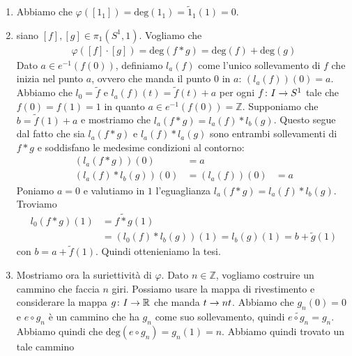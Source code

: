 \documentclass[a4paper]{article}
\begin{document}
\begin{snippetproof}{}
    \begin{enumerate}
        \item Abbiamo che \(\varphi([1_1]) = \text{deg}(1_1) = \tilde 1_1(1) = 0\).
        \item siano \([f], [g] \in \pi_1(S^1, 1)\). Vogliamo che
        \begin{align*}
            \varphi([f] \cdot [g]) = \text{deg}(f \ast g)
            = \text{deg}(f) + \text{deg}(g)
        \end{align*}
        Dato \(a \in e^{-1}(f(0))\), definiamo \(l_a(f)\) come l'unico
        sollevamento di \(f\) che inizia nel punto \(a\),
        ovvero che manda il punto \(0\) in \(a\): \((l_a(f))(0) = a\).
        Abbiamo che \(l_0 = \tilde f\)
        e \(l_a(f)(t) = \tilde f(t) + a\) per ogni \(f \colon I \to S^1\)
        tale che \(f(0) = f(1) = 1\) in quanto
        \(a \in e^{-1}(f(0)) = \mathbb{Z}\).
        Supponiamo che \(b = \tilde f(1) + a\)
        e mostriamo che \(l_a(f \ast g) = l_a(f) \ast l_b(g)\).
        Questo segue dal fatto che sia \(l_a(f \ast g)\) e \(l_a(f) \ast l_a(g)\)
        sono entrambi sollevamenti di \(f \ast g\) e soddisfano le medesime condizioni al contorno:
        \begin{align*}
            (l_a(f\ast g))(0) &= a \\
            (l_a(f) \ast l_b(g))(0) &= (l_a(f))(0) &= a
        \end{align*}
        Poniamo \(a=0\) e valutiamo in \(1\) l'eguaglianza \(l_a(f \ast g) = l_a(f) \ast l_b(g)\).
        Troviamo
        \begin{align*}
            l_0(f\ast g)(1) &= \tilde{f \ast g}(1) \\
            &=(l_0(f) \ast l_b(g))(1) = l_b(g)(1) = b + \tilde g(1)
        \end{align*}
        con \(b = a + \tilde f(1)\).
        Quindi ottenieniamo la tesi.
        \item Mostriamo ora la suriettività di \(\varphi\).
        Dato \(n \in \mathbb{Z}\), vogliamo costruire un cammino che faccia \(n\) giri.
        Possiamo usare la mappa di rivestimento e considerare la mappa \(g \colon I \to \mathbb{R}\)
        che manda \(t \to nt\).
        Abbiamo che \(g_n(0) = 0\)
        e \(e \circ g_n\) è un cammino che ha \(g_n\) come suo sollevamento, quindi
        \(\tilde{e\circ g_n} = g_n\).
        Abbiamo quindi che \(\text{deg}(e \circ g_n) = g_n(1) = n\). Abbiamo quindi trovato
        un tale cammino

\end{enumerate}
\end{snippetproof}
\end{document}
